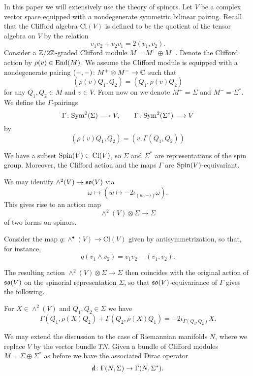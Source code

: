 \documentclass[10pt, oneside]{article}
\newcommand{\Cl}{\mathrm{Cl}}
\begin{document}
In this paper we will extensively use the theory of spinors. Let $V$ be a complex vector space equipped with a nondegenerate symmetric bilinear pairing. Recall that the Clifford algebra $\Cl(V)$ is defined to be the quotient of the tensor algebra on $V$ by the relation
\[v_1 v_2 + v_2 v_1 = 2(v_1, v_2).\]
Consider a $\mathbb Z/2\mathbb Z$-graded Clifford module $M=M^+\oplus M^-$. Denote the Clifford action by $\rho(v)\in\operatorname{End}(M)$. We assume the Clifford module is equipped with a nondegenerate pairing $(-, -)\colon M^+\otimes M^-\rightarrow \mathbb C$ such that
\[(\rho(v) Q_1, Q_2) = (Q_1, \rho(v) Q_2)\]
for any $Q_1, Q_2\in M$ and $v\in V$. From now on we denote $M^+=\Sigma$ and $M^-=\Sigma^*$. We define the $\Gamma$-pairings
\[\Gamma\colon{\rm Sym}^2(\Sigma)\longrightarrow V,\qquad \Gamma\colon{\rm Sym}^2(\Sigma^*)\longrightarrow V\]
by
\begin{equation}
(\rho(v) Q_1, Q_2) = (v, \Gamma(Q_1, Q_2))
\label{eq:Gammaspinorpairing}
\end{equation}

We have a subset $\Spin(V)\subset \Cl(V)$, so $\Sigma$ and $\Sigma^*$ are representations of the spin group. Moreover, the Clifford action and the maps $\Gamma$ are $\mathrm{Spin}(V)$-equivariant.

We may identify $\wedge^2(V)\rightarrow \mathfrak{so}(V)$ via
\[\omega\mapsto (w\mapsto -2\iota_{(w, -\rangle)} \omega).\]
This gives rise to an action map
\[\wedge^2(V)\otimes \Sigma\longrightarrow \Sigma\]
of two-forms on spinors.

Consider the map $q\colon \wedge^\bullet(V)\rightarrow \Cl(V)$ given by antisymmetrization, so that, for instance,
\begin{equation}
q(v_1\wedge v_2) = v_1v_2 - (v_1, v_2).
\label{eq:quantizationtwoforms}
\end{equation}

The resulting action $\wedge^2(V)\otimes \Sigma\rightarrow \Sigma$ then coincides with the original action of $\mathfrak{so}(V)$ on the spinorial representation $\Sigma$, so that $\mathfrak{so}(V)$-equivariance of $\Gamma$ gives the following.

\begin{prop}
For $X\in\wedge^2(V)$ and $Q_1,Q_2\in\Sigma$ we have
\[\Gamma(Q_1, \rho(X) Q_2) + \Gamma(Q_2, \rho(X) Q_1) = -2\iota_{\Gamma(Q_1, Q_2)} X.\]
\label{prop:cliffordactionproperty1}
\end{prop}

We may extend the discussion to the case of Riemannian manifolds $N$, where we replace $V$ by the vector bundle $TN$. Given a bundle of Clifford modules $M=\Sigma\oplus \Sigma^*$ as before we have the associated Dirac operator
\[\sd{\d}\colon \Gamma(N, \Sigma)\rightarrow \Gamma(N, \Sigma^*).\]
\end{document}
